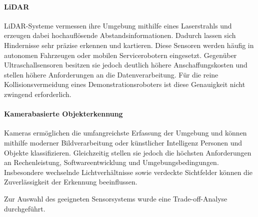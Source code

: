 \paragraph{LiDAR}

LiDAR-Systeme vermessen ihre Umgebung mithilfe eines Laserstrahls und erzeugen dabei hochauflösende Abstandsinformationen. Dadurch lassen sich Hindernisse sehr präzise erkennen und kartieren. Diese Sensoren werden häufig in autonomen Fahrzeugen oder mobilen Servicerobotern eingesetzt. Gegenüber Ultraschallsensoren besitzen sie jedoch deutlich höhere Anschaffungskosten und stellen höhere Anforderungen an die Datenverarbeitung. Für die reine Kollisionsvermeidung eines Demonstrationsroboters ist diese Genauigkeit nicht zwingend erforderlich. \cite{fraden2016sensors}

\paragraph{Kamerabasierte Objekterkennung}

Kameras ermöglichen die umfangreichste Erfassung der Umgebung und können mithilfe moderner Bildverarbeitung oder künstlicher Intelligenz Personen und Objekte klassifizieren. Gleichzeitig stellen sie jedoch die höchsten Anforderungen an Rechenleistung, Softwareentwicklung und Umgebungsbedingungen. Insbesondere wechselnde Lichtverhältnisse sowie verdeckte Sichtfelder können die Zuverlässigkeit der Erkennung beeinflussen. \cite{Szeliski2022}

Zur Auswahl des geeigneten Sensorsystems wurde eine Trade-off-Analyse durchgeführt.

